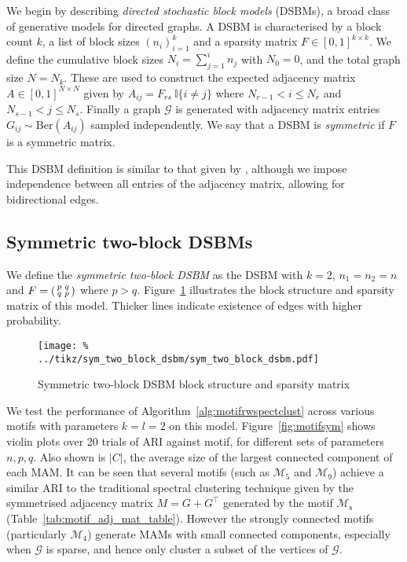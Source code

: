 \documentclass[12pt]{ociamthesis}
\theoremstyle{plain}
\theoremstyle{definition}
\theoremstyle{remark}
\newcommand\bb[1]{\mathbb{#1}}
\newcommand\ca[1]{\mathcal{#1}}
\begin{document}
We begin by describing \emph{directed stochastic block models} (DSBMs), a broad
class of generative models for directed graphs. A DSBM is characterised by a
block count $k$, a list of block sizes $(n_i)_{i=1}^k$ and a sparsity matrix $F
\in [0,1]^{k \times k}$. We define the cumulative block sizes $N_i =
\sum_{j=1}^i n_j$ with $N_0=0$, and the total graph size $N=N_k$. These are
used to construct the expected adjacency matrix $A \in [0,1]^{N \times N}$
given by $A_{i j} = F_{rs} \ \bb{I}\{i \neq j\}$ where $N_{r-1} < i \leq N_r$
and $N_{s-1} < j \leq N_s$. Finally a graph $\ca{G}$ is generated with
adjacency matrix entries $G_{i j} \sim \textrm{Ber}(A_{i j})$ sampled
independently. We say that a DSBM is \emph{symmetric} if $F$ is a symmetric
matrix.

This DSBM definition is similar to that given by \cite{DirectedClustImbCuts},
although we impose independence between all entries of the adjacency matrix,
allowing for bidirectional edges.

\subsection{Symmetric two-block DSBMs}

We define the \emph{symmetric two-block DSBM} as the DSBM with $k=2$,
$n_1=n_2=n$ and
$F =
\begin{psmallmatrix}
p & q \\ q & p
\end{psmallmatrix}$
where $p > q$. Figure~\ref{fig:sym_two_block_dsbm} illustrates the block
structure and sparsity matrix of this model. Thicker lines indicate existence
of edges with higher probability.

\begin{figure}[H]
\centering
\texttt{[image: \%
../tikz/sym\_two\_block\_dsbm/sym\_two\_block\_dsbm.pdf]}
\caption{Symmetric two-block DSBM block structure and sparsity matrix}
\label{fig:sym_two_block_dsbm}
\end{figure}

We test the performance of Algorithm~\ref{alg:motifrwspectclust} across various
motifs with parameters $k=l=2$ on this model.
Figure~\ref{fig:motifsym} shows violin plots over 20 trials of ARI against
motif, for different sets of parameters $n,p,q$.
Also shown is $|C|$, the average size of the largest connected component of
each MAM.
It can be seen that several motifs (such as $\ca{M}_5$ and $\ca{M}_9$) achieve
a similar ARI to the traditional spectral clustering technique given by the
symmetrised adjacency matrix $M=G+G^\top$ generated by the motif
$\ca{M}_\mathrm{s}$ (Table~\ref{tab:motif_adj_mat_table}).
However the strongly connected motifs (particularly $\ca{M}_4$) generate MAMs
with small connected components, especially when $\ca{G}$ is sparse, and hence
only cluster a subset of the vertices of $\ca{G}$.
\end{document}
